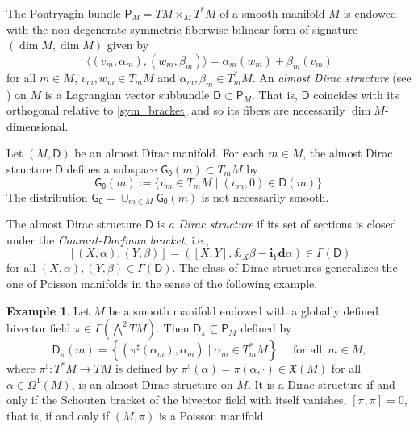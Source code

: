 \documentclass{amsart}
\theoremstyle{definition}
\newtheorem{example}[theorem]{Example}
\begin{document}
The Pontryagin bundle $\mathsf{P}_M=TM
\times_M T^* M$ of a smooth manifold $M$ is
endowed with the  non-degenerate symmetric fiberwise 
bilinear form of signature\linebreak $(\dim M, \dim M)$ given by
\begin{equation}
\langle(v_m,\alpha_m), (w_m,\beta_m)\rangle=\alpha_m(w_m)+\beta_m(v_m)
\label{sym_bracket}
\end{equation}
for all $m\in M$, $v_m,w_m\in T_mM$ and $\alpha_m,\beta_m\in T_m^*M$. An
\emph{almost Dirac structure} (see \cite{Courant90a}) on $M $ is a Lagrangian vector 
subbundle $\mathsf{D} \subset \mathsf{P}_M $. That is, $ \mathsf{D}$ coincides with its
orthogonal relative to \eqref{sym_bracket} and so its fibers are necessarily $\dim M $-dimensional.

\medskip

Let $(M,\mathsf D)$ be an almost Dirac manifold. 
For each $m\in M$, the almost Dirac structure $\mathsf{D}$ 
defines a subspace
$\mathsf{G_0}(m)\subset T_mM $ by 
\[
\mathsf{G_0}(m):= \{v_m \in T_mM \mid (v_m, 0)\in\mathsf D(m) \}.\]
The distribution $\mathsf{G_0}=\cup_{m\in M}\mathsf{G_0}(m)$
is not necessarily smooth. 

The almost Dirac structure $\mathsf D$ is 
\emph{a Dirac structure} if its set of sections is closed under the
 \emph{Courant-Dorfman bracket}, i.e.,
\begin{equation}\label{Courant_bracket}
[(X, \alpha), (Y, \beta) ]  
= \left( [X, Y],  \boldsymbol{\pounds}_{X} \beta - {{\mathbf{i}}_{{Y}}} {\mathbf{d}}\alpha \right)
\in\Gamma(\mathsf D)
\end{equation} 
for all $(X,\alpha), (Y,\beta)\in\Gamma(\mathsf D)$.
The class of
Dirac structures generalizes the one of Poisson manifolds in the sense
of the following example.
\begin{example}\label{exPoisson}
Let $M$ be a smooth manifold endowed with a globally defined bivector field
$\pi\in\Gamma\left(\bigwedge^2 TM\right)$.  Then  $\mathsf
D_\pi\subseteq \mathsf P_M$ defined by
\[\mathsf{D}_\pi(m)=\left\{(\pi^\sharp(\alpha_m),\alpha_m)\mid
  \alpha_m\in T_m^*M \right\}\quad \text{ for all }\, m\in M,
\]
where $\pi^\sharp:T^*M\to TM$ is defined by 
$\pi^\sharp(\alpha)=\pi(\alpha,\cdot)\in{\mathfrak{X}}(M)$ for all
$\alpha\in\Omega^1(M)$,
is an almost Dirac structure on $M$. It is a Dirac structure if and only if the Schouten bracket
of the bivector field with itself 
vanishes,
$[\pi,\pi]=0$, that is, if and only if $(M,\pi)$ is a Poisson manifold.
\end{example}
\end{document}
